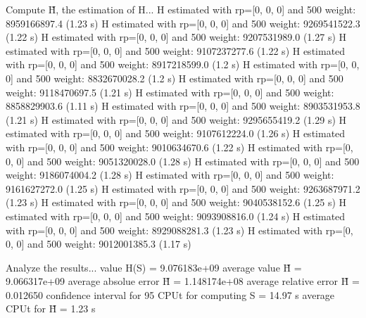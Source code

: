 Compute H̃, the estimation of H...
  H estimated with rp=[0, 0, 0] and 500 weight:  8959166897.4  (1.23 s)
  H estimated with rp=[0, 0, 0] and 500 weight:  9269541522.3  (1.22 s)
  H estimated with rp=[0, 0, 0] and 500 weight:  9207531989.0  (1.27 s)
  H estimated with rp=[0, 0, 0] and 500 weight:  9107237277.6  (1.22 s)
  H estimated with rp=[0, 0, 0] and 500 weight:  8917218599.0  (1.2 s)
  H estimated with rp=[0, 0, 0] and 500 weight:  8832670028.2  (1.2 s)
  H estimated with rp=[0, 0, 0] and 500 weight:  9118470697.5  (1.21 s)
  H estimated with rp=[0, 0, 0] and 500 weight:  8858829903.6  (1.11 s)
  H estimated with rp=[0, 0, 0] and 500 weight:  8903531953.8  (1.21 s)
  H estimated with rp=[0, 0, 0] and 500 weight:  9295655419.2  (1.29 s)
  H estimated with rp=[0, 0, 0] and 500 weight:  9107612224.0  (1.26 s)
  H estimated with rp=[0, 0, 0] and 500 weight:  9010634670.6  (1.22 s)
  H estimated with rp=[0, 0, 0] and 500 weight:  9051320028.0  (1.28 s)
  H estimated with rp=[0, 0, 0] and 500 weight:  9186074004.2  (1.28 s)
  H estimated with rp=[0, 0, 0] and 500 weight:  9161627272.0  (1.25 s)
  H estimated with rp=[0, 0, 0] and 500 weight:  9263687971.2  (1.23 s)
  H estimated with rp=[0, 0, 0] and 500 weight:  9040538152.6  (1.25 s)
  H estimated with rp=[0, 0, 0] and 500 weight:  9093908816.0  (1.24 s)
  H estimated with rp=[0, 0, 0] and 500 weight:  8929088281.3  (1.23 s)
  H estimated with rp=[0, 0, 0] and 500 weight:  9012001385.3  (1.17 s)

Analyze the results...
  value H(S)                  = 9.076183e+09 
  average value H̃             = 9.066317e+09 
  average absolue error H̃     = 1.148174e+08 
  average relative error H̃    = 0.012650 
  confidence interval for 95%
  CPUt for computing S         = 14.97 s
  average CPUt for H̃           = 1.23 s

